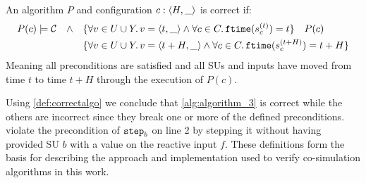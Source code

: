 \begin{definition}\label{def:correctalgo}
  An algorithm $P$ and configuration $c:  \left\langle H, \_ \right\rangle $ is correct if:
  \vspace{-0.5em}
  \begin{align*}
     P(c) \models \mathcal{C} \quad \land \quad
     &\{\forall v \in U \cup Y \ldotp v =  \left\langle t, \_ \right\rangle  \land \forall c \in C \ldotp \mathtt{ftime}(s_{c}^{(t)}) = t\} \quad P(c) \\
     & \{\forall v \in U \cup Y \ldotp v =  \left\langle t+H, \_ \right\rangle  \land \forall c \in C \ldotp \mathtt{ftime}(s_{c}^{(t+H)}) = t+H \}
  \end{align*}
  Meaning all preconditions are satisfied and all SUs and inputs have moved from time $t$ to time $t+H$ through the execution of $P(c)$.
\end{definition}
\vspace{-0.5em}

Using \cref{def:correctalgo} we conclude that \cref{alg:algorithm_3} is correct while the others are incorrect since they break one or more of the defined preconditions.  violate the precondition of $\mathtt{step}_{b}$ on line 2 by stepping it without having provided SU $b$ with a value on the reactive input $f$. 
These definitions form the basis for describing the approach and implementation used to verify co-simulation algorithms in this work.